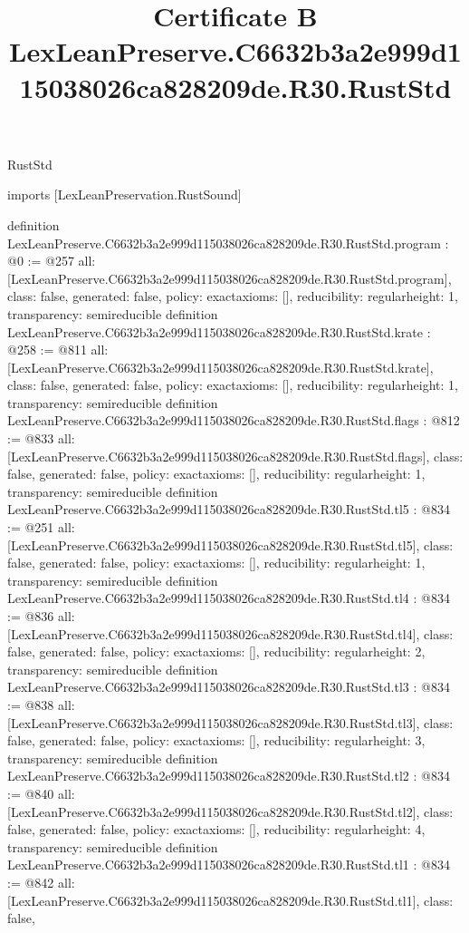 \begin{lexlean}{RustStd}
\title{Certificate B LexLeanPreserve.C6632b3a2e999d115038026ca828209de.R30.RustStd}
\begin{coremodule}
imports [LexLeanPreservation.RustSound]

definition LexLeanPreserve.C6632b3a2e999d115038026ca828209de.R30.RustStd.program : @0 := @257 {
  all: [LexLeanPreserve.C6632b3a2e999d115038026ca828209de.R30.RustStd.program],
  class: false,
  generated: false,
  policy: exact{axioms: []},
  reducibility: regular{height: 1},
  transparency: semireducible
}
definition LexLeanPreserve.C6632b3a2e999d115038026ca828209de.R30.RustStd.krate : @258 := @811 {
  all: [LexLeanPreserve.C6632b3a2e999d115038026ca828209de.R30.RustStd.krate],
  class: false,
  generated: false,
  policy: exact{axioms: []},
  reducibility: regular{height: 1},
  transparency: semireducible
}
definition LexLeanPreserve.C6632b3a2e999d115038026ca828209de.R30.RustStd.flags : @812 := @833 {
  all: [LexLeanPreserve.C6632b3a2e999d115038026ca828209de.R30.RustStd.flags],
  class: false,
  generated: false,
  policy: exact{axioms: []},
  reducibility: regular{height: 1},
  transparency: semireducible
}
definition LexLeanPreserve.C6632b3a2e999d115038026ca828209de.R30.RustStd.tl5 : @834 := @251 {
  all: [LexLeanPreserve.C6632b3a2e999d115038026ca828209de.R30.RustStd.tl5],
  class: false,
  generated: false,
  policy: exact{axioms: []},
  reducibility: regular{height: 1},
  transparency: semireducible
}
definition LexLeanPreserve.C6632b3a2e999d115038026ca828209de.R30.RustStd.tl4 : @834 := @836 {
  all: [LexLeanPreserve.C6632b3a2e999d115038026ca828209de.R30.RustStd.tl4],
  class: false,
  generated: false,
  policy: exact{axioms: []},
  reducibility: regular{height: 2},
  transparency: semireducible
}
definition LexLeanPreserve.C6632b3a2e999d115038026ca828209de.R30.RustStd.tl3 : @834 := @838 {
  all: [LexLeanPreserve.C6632b3a2e999d115038026ca828209de.R30.RustStd.tl3],
  class: false,
  generated: false,
  policy: exact{axioms: []},
  reducibility: regular{height: 3},
  transparency: semireducible
}
definition LexLeanPreserve.C6632b3a2e999d115038026ca828209de.R30.RustStd.tl2 : @834 := @840 {
  all: [LexLeanPreserve.C6632b3a2e999d115038026ca828209de.R30.RustStd.tl2],
  class: false,
  generated: false,
  policy: exact{axioms: []},
  reducibility: regular{height: 4},
  transparency: semireducible
}
definition LexLeanPreserve.C6632b3a2e999d115038026ca828209de.R30.RustStd.tl1 : @834 := @842 {
  all: [LexLeanPreserve.C6632b3a2e999d115038026ca828209de.R30.RustStd.tl1],
  class: false,
}
\end{coremodule}
\end{lexlean}

